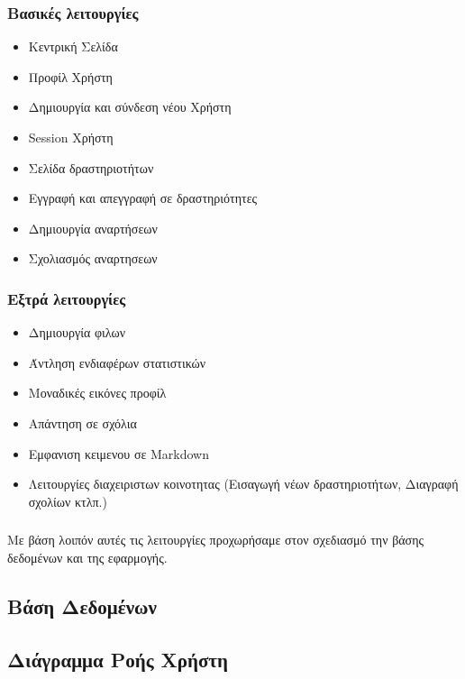 \documentclass[acmtog, nonacm, language=english, language=greek]{acmart}
\newcommand{\en}[1]{\textlatin{#1}}
\begin{document}
\subsubsection{Βασικές λειτουργίες}
\begin{itemize}
    \item Κεντρική Σελίδα
    \item Προφίλ Χρήστη
    \item Δημιουργία και σύνδεση νέου Χρήστη
    \item \en{Session} Χρήστη
    \item Σελίδα δραστηριοτήτων
    \item Εγγραφή και απεγγραφή σε δραστηριότητες
    \item Δημιουργία αναρτήσεων
    \item Σχολιασμός αναρτησεων
\end{itemize}

\subsubsection{Εξτρά λειτουργίες}
\begin{itemize}
    \item Δημιουργία φιλων
    \item Άντληση ενδιαφέρων στατιστικών
    \item Μοναδικές εικόνες προφίλ
    \item Απάντηση σε σχόλια
    \item Εμφανιση κειμενου σε \en{Markdown}
    \item Λειτουργίες διαχειριστων κοινοτητας (Εισαγωγή νέων δραστηριοτήτων, Διαγραφή σχολίων κτλπ.)
\end{itemize}

\subsubsection*{}
Με βάση λοιπόν αυτές τις λειτουργίες προχωρήσαμε στον σχεδιασμό την βάσης δεδομένων και της εφαρμογής.


\subsection{Βάση Δεδομένων}


\subsection{Διάγραμμα Ροής Χρήστη}
\end{document}
